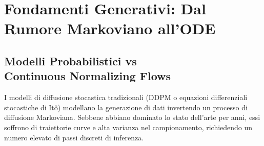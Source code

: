 \documentclass[12pt,a4paper]{report}
\begin{document}
\tableofcontents
\newpage

\chapter{Fondamenti Generativi: Dal Rumore Markoviano all'ODE}
\section[Modelli Probabilistici vs Continuous Normalizing Flows]{Modelli Probabilistici vs\\ Continuous Normalizing Flows}
I modelli di diffusione stocastica tradizionali (DDPM o equazioni differenziali stocastiche di It\^o) modellano la generazione di dati invertendo un processo di diffusione Markoviana. Sebbene abbiano dominato lo stato dell'arte per anni, essi soffrono di traiettorie curve e alta varianza nel campionamento, richiedendo un numero elevato di passi discreti di inferenza. 
\end{document}
